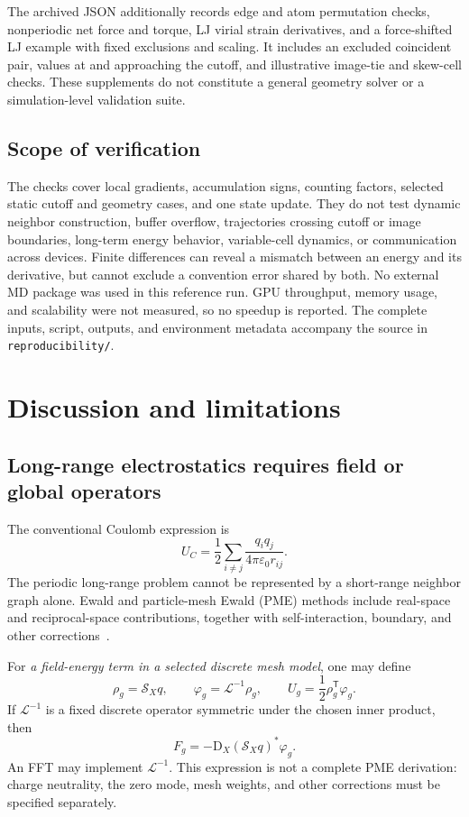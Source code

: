 \documentclass[11pt,a4paper]{article}
\theoremstyle{definition}
\begin{document}
The archived JSON additionally records edge and atom permutation checks, nonperiodic net force
and torque, LJ virial strain derivatives, and a force-shifted LJ example with fixed exclusions
and scaling. It includes an excluded coincident pair, values at and approaching the cutoff,
and illustrative image-tie and skew-cell checks. These supplements do not constitute a general
geometry solver or a simulation-level validation suite.

\subsection{Scope of verification}
The checks cover local gradients, accumulation signs, counting factors, selected static cutoff
and geometry cases, and one state update. They do not test dynamic neighbor construction,
buffer overflow, trajectories crossing cutoff or image boundaries, long-term energy behavior,
variable-cell dynamics, or communication across devices. Finite differences can reveal a
mismatch between an energy and its derivative, but cannot exclude a convention error shared
by both. No external MD package was used in this reference run. GPU throughput, memory usage,
and scalability were not measured, so no speedup is reported. The complete inputs, script,
outputs, and environment metadata accompany the source in \texttt{reproducibility/}.
\section{Discussion and limitations}
\label{sec:extensions}
\subsection{Long-range electrostatics requires field or global operators}
The conventional Coulomb expression is
\begin{equation}
U_C=\frac12\sum_{i\ne j}\frac{q_iq_j}{4\pi\varepsilon_0r_{ij}}.
\end{equation}
The periodic long-range problem cannot be represented by a short-range neighbor graph
alone. Ewald and particle-mesh Ewald (PME) methods include real-space and reciprocal-space
contributions, together with self-interaction, boundary, and other
corrections~\cite{gromacs-electro}.

For \emph{a field-energy term in a selected discrete mesh model}, one may define
\begin{equation}
\rho_g=\mathcal S_Xq,\qquad
\varphi_g=\mathcal L^{-1}\rho_g,\qquad
U_g=\frac12\rho_g^{\mathsf T}\varphi_g.
\end{equation}
If $\mathcal L^{-1}$ is a fixed discrete operator symmetric under the chosen inner product, then
\begin{equation}
F_g=-\mathrm D_X(\mathcal S_Xq)^*\varphi_g.
\end{equation}
An FFT may implement $\mathcal L^{-1}$. This expression is not a complete PME derivation: charge
neutrality, the zero mode, mesh weights, and other corrections must be specified separately.
\end{document}
